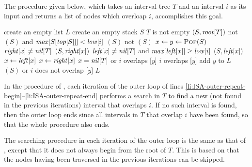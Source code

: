 \documentclass[a4paper, fleqn]{article}
\begin{document}
The procedure  given below, which takes an
interval tree $T$ and an interval $i$ as its input and returns a list
of nodes which overloap $i$, accomplishes this goal.

\begin{codebox}
\li create an empty list $L$
\li create an empty stack $S$
\li \If $T$ is not empty
\li   \Then {}$(S, \id{root}[T])$ \End
\li \Repeat                        \label{li:ISA-outer-repeat-begin}
\li     \While not $(S)$
           and $\id{max}[S[\id{top}[S]]] < \id{low}[i]$
                                           \label{li:ISA-while-begin}
\li       \Do {}$(S)$ \End         \label{li:ISA-while-end}
\li     \If not $(S)$
\li       \Then
            \Repeat                 \label{li:ISA-inner-repeat-begin}
\li           $x \gets y \gets \textnormal{\scshape Pop}(S)$
\li           \If $\id{right}[x] \neq \id{nil}[T]$
\li             \Then {}$(S, \id{right}[x])$ \End
\li           \If $\id{left}[x] \neq \id{nil}[T]$
                and $\id{max}[\id{left}[x]] \geq \id{low}[i]$
\li             \Then
                  $(S, \id{left}[x])$
\li               $x \gets \id{left}[x]$
\li             \Else
                  $x \gets \id{right}[x]$
                \End
\li         \Until $x = \id{nil}[T]$ or $i$ overlaps [$y$]
                                      \label{li:ISA-inner-repeat-end}
\li         \If $i$ overlaps [$y$]
\li           \Then add $y$ to $L$ \End
          \End
\li \Until {}$(S)$ or $i$ does not overlap [$y$]
                                      \label{li:ISA-outer-repeat-end}
\li \Return $L$
\end{codebox}

In the procedure of , each iteration of the
outer  loop of lines
\ref{li:ISA-outer-repeat-begin}--\ref{li:ISA-outer-repeat-end}
performs a search in $T$ to find a new (not found in the previous
iterations) interval that overlaps $i$. If no such interval is found,
then the outer  loop ends since all intervals in $T$ that
overlap $i$ have been found, so that the whole procedure also ends.

The searching procedure in each iteration of the outer 
loop is the same as that of , except that it
does not always begin from the root of $T$. This is based on that the
nodes having been traversed in the previous iterations can be skipped.
\end{document}
